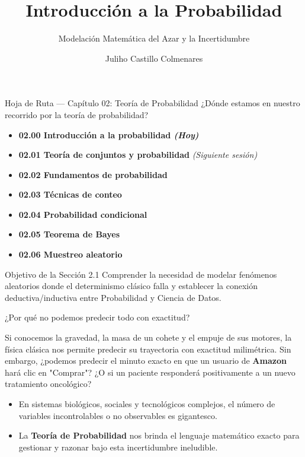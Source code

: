 \documentclass[10pt,aspectratio=169]{beamer}
\title[Introducción a la Probabilidad]{Introducción a la Probabilidad}
\subtitle{Modelación Matemática del Azar y la Incertidumbre}
\author[J. Castillo Colmenares]{Juliho Castillo Colmenares}
\institute{Tecnológico de Monterrey}
\date{}
\begin{document}
\begin{frame}[plain]
  \vspace{-0.8cm}
  \titlepage
\end{frame}

\begin{frame}{Hoja de Ruta — Capítulo 02: Teoría de Probabilidad}
  ¿Dónde estamos en nuestro recorrido por la teoría de probabilidad? \pause
  \begin{itemize}
    \item \color{TecRojo}\textbf{02.00 Introducción a la probabilidad \emph{(Hoy)}}\color{black} \pause
    \item \textbf{02.01 Teoría de conjuntos y probabilidad} \emph{(Siguiente sesión)} \pause
    \item \textbf{02.02 Fundamentos de probabilidad} \pause
    \item \textbf{02.03 Técnicas de conteo} \pause
    \item \textbf{02.04 Probabilidad condicional} \pause
    \item \textbf{02.05 Teorema de Bayes} \pause
    \item \textbf{02.06 Muestreo aleatorio}
  \end{itemize}
  \vspace{0.8em}
  \begin{block}{Objetivo de la Sección 2.1}
    Comprender la necesidad de modelar fenómenos aleatorios donde el determinismo clásico falla y establecer la conexión deductiva/inductiva entre Probabilidad y Ciencia de Datos.
  \end{block}
\end{frame}

\begin{frame}{¿Por qué no podemos predecir todo con exactitud?}
  \begin{motivacion}
    Si conocemos la gravedad, la masa de un cohete y el empuje de sus motores, la física clásica nos permite predecir su trayectoria con exactitud milimétrica. Sin embargo, ¿podemos predecir el minuto exacto en que un usuario de \textbf{Amazon} hará clic en "Comprar"? ¿O si un paciente responderá positivamente a un nuevo tratamiento oncológico?
  \end{motivacion}
  
  \vspace{0.6em}
  \pause
  \begin{itemize}
    \item En sistemas biológicos, sociales y tecnológicos complejos, el número de variables incontrolables o no observables es gigantesco. \pause
    \item La \textbf{Teoría de Probabilidad} nos brinda el lenguaje matemático exacto para gestionar y razonar bajo esta incertidumbre ineludible.
  \end{itemize}
\end{frame}
\end{document}
